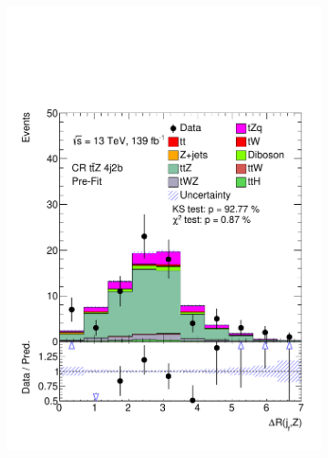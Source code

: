 \begin{figure}[!h]
\begin{subfigure}[b]{0.33\linewidth}
    \includegraphics[width=\linewidth]{ubonn-thesis/Chapters/Chapters_06/Figure/Input_distribution/CR_4j2b_dRjfZ.pdf} 
  \end{subfigure}%
  \begin{subfigure}[b]{0.33\linewidth}
    \centering

\end{subfigure}
\end{figure}
